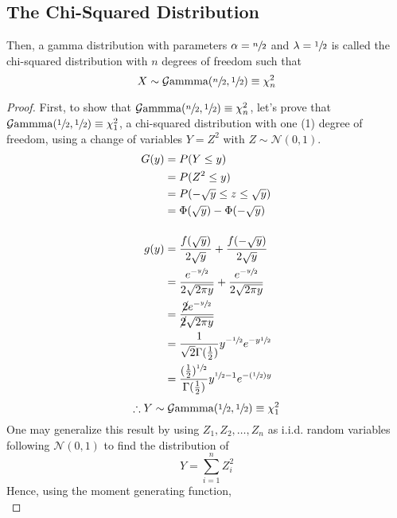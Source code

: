 \documentclass[12pt]{article}
\newcommand{\G}{\mathcal{G}}
\newcommand{\N}{\mathcal{N}}
\begin{document}
\subsection{The Chi-Squared Distribution}\label{subsec:specialcases:chi2}
Then, a gamma distribution with parameters $\alpha=\sfrac{n}{2}$ and $\lambda=\sfrac{1}{2}$ is called the
chi-squared distribution with $n$ degrees of freedom such that
\begin{equation}
	X\sim\G\text{ammma}(\sfrac{n}{2}, \sfrac{1}{2})\equiv\chi^2_n
\end{equation}
\begin{proof}
	First, to show that $\G\text{ammma}(\sfrac{n}{2},\sfrac{1}{2})\equiv\chi^2_n$, let's prove that
	$\G\text{ammma}(\sfrac{1}{2},\sfrac{1}{2})\equiv\chi^2_1$, a chi-squared distribution with one (1) degree of
	freedom, using a change of variables $Y=Z^2$ with $Z\sim\N(0, 1)$.
	\begin{equation}\label{eq:relation:chisquared:1}
		\begin{split}
			G(y)	&=	P(Y\leq y)\\
					&=	P(Z^2\leq y)\\
					&=	P(-\sqrt{y}\leq z \leq \sqrt{y})\\
					&=	\Phi(\sqrt{y})-\Phi(-\sqrt{y})\\[12pt]
			g(y)	&=	\frac{f(\sqrt{y})}{2\sqrt{y}}+\frac{f(-\sqrt{y})}{2\sqrt{y}}\\
					&=	\frac{e^{-\sfrac{y}{2}}}{2\sqrt{2\pi y}} + \frac{e^{-\sfrac{y}{2}}}{2\sqrt{2\pi y}}\\
					&=	\frac{\cancel{2}e^{-\sfrac{y}{2}}}{\cancel{2}\sqrt{2\pi y}}\\
					&=	\frac{1}{\sqrt{2}\Gamma(\frac{1}{2})}y^{-\sfrac{1}{2}}e^{-y\sfrac{1}{2}}\\
					&=	\frac{(\frac{1}{2})^{\sfrac{1}{2}}}{\Gamma(\frac{1}{2})}y^{\sfrac{1}{2}-1}e^{-(\sfrac{1}{2})y}
			\end{split}
	\end{equation}
	\begin{equation}
		\therefore Y\sim\G\text{ammma}(\sfrac{1}{2}, \sfrac{1}{2})\equiv\chi^2_1
	\end{equation}
	One may generalize this result by using $Z_1, Z_2, \ldots, Z_n$ as i.i.d. random variables following $\N(0, 1)$ to
	find the distribution of
	\begin{equation}
		Y = \sum^n_{i=1}Z^2_i
	\end{equation}
	Hence, using the moment generating function,
	\begin{equation}\label{eq:relation:chisquared:n}

\end{equation}
\end{proof}
\end{document}
